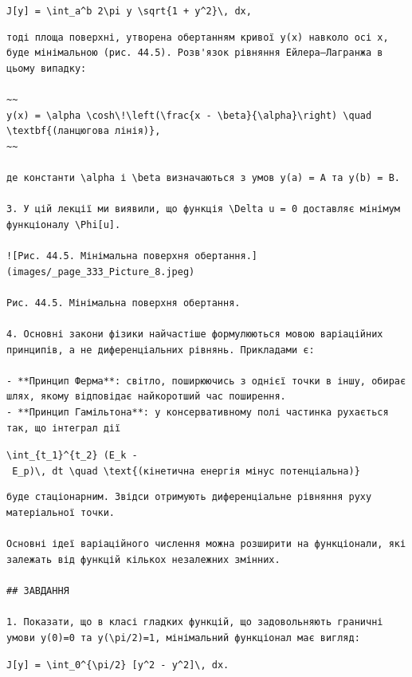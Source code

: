 \documentclass[
  ukrainian,
]{article}
\begin{document}
\texttt{J{[}y{]}\ =\ \textbackslash{}int\_a\^{}b\ 2\textbackslash{}pi\ y\ \textbackslash{}sqrt\{1\ +\ y\textquotesingle{}\^{}2\}\textbackslash{},\ dx,}

\begin{verbatim}
тоді площа поверхні, утворена обертанням кривої y(x) навколо осі x, буде мінімальною (рис. 44.5). Розв'язок рівняння Ейлера–Лагранжа в цьому випадку:

~~
y(x) = \alpha \cosh\!\left(\frac{x - \beta}{\alpha}\right) \quad \textbf{(ланцюгова лінія)},
~~

де константи \alpha і \beta визначаються з умов y(a) = A та y(b) = B.

3. У цій лекції ми виявили, що функція \Delta u = 0 доставляє мінімум функціоналу \Phi[u].

![Рис. 44.5. Мінімальна поверхня обертання.](images/_page_333_Picture_8.jpeg)

Рис. 44.5. Мінімальна поверхня обертання.

4. Основні закони фізики найчастіше формулюються мовою варіаційних принципів, а не диференціальних рівнянь. Прикладами є:

- **Принцип Ферма**: світло, поширюючись з однієї точки в іншу, обирає шлях, якому відповідає найкоротший час поширення.
- **Принцип Гамільтона**: у консервативному полі частинка рухається так, що інтеграл дії
\end{verbatim}

\texttt{\textbackslash{}int\_\{t\_1\}\^{}\{t\_2\}\ (E\_k\ -\ E\_p)\textbackslash{},\ dt\ \textbackslash{}quad\ \textbackslash{}text\{(кінетична\ енергія\ мінус\ потенціальна)\}}

\begin{verbatim}
буде стаціонарним. Звідси отримують диференціальне рівняння руху матеріальної точки.

Основні ідеї варіаційного числення можна розширити на функціонали, які залежать від функцій кількох незалежних змінних.

## ЗАВДАННЯ

1. Показати, що в класі гладких функцій, що задовольняють граничні умови y(0)=0 та y(\pi/2)=1, мінімальний функціонал має вигляд:
\end{verbatim}

\texttt{J{[}y{]}\ =\ \textbackslash{}int\_0\^{}\{\textbackslash{}pi/2\}\ {[}y\textquotesingle{}\^{}2\ -\ y\^{}2{]}\textbackslash{},\ dx.}
\end{document}
